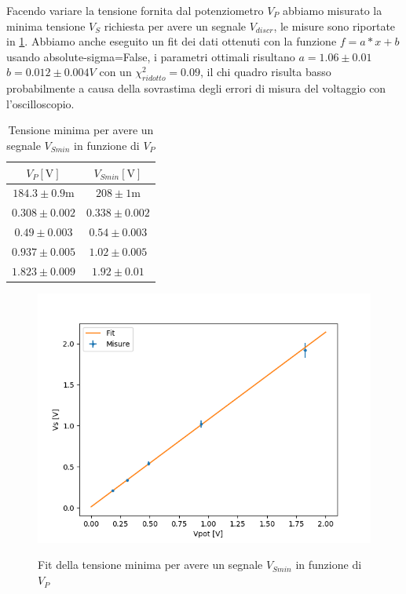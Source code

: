 \documentclass{article}
\begin{document}
		Facendo variare la tensione fornita dal potenziometro $V_P$ abbiamo misurato la minima tensione $V_S$ richiesta per avere un segnale $V_{discr}$, le misure sono riportate in \ref{tab 1c2}. Abbiamo anche eseguito un fit dei dati ottenuti con la funzione $f=a*x+b$ usando absolute-sigma=False, i parametri ottimali risultano $a=1.06\pm0.01$ $b=0.012\pm0.004 V$ con un $\chi^2_{ridotto}=0.09$, il chi quadro risulta basso probabilmente a causa della sovrastima degli errori di misura del voltaggio con l'oscilloscopio.
		\begin{table}
			\begin{center}
				\begin{tabular}{cc}
					\hline
					$V_P [\mathrm{V}]$&$V_{Smin} [\mathrm{V}]$ \\
					\hline
					$184.3\pm0.9 \mathrm{m}$ & $208\pm1\mathrm{m}$ \\
					$0.308\pm0.002$ & $0.338\pm0.002$ \\
					$0.49\pm0.003$ & $0.54\pm0.003$ \\
					$0.937\pm0.005$ & $1.02\pm0.005$ \\
					$1.823\pm0.009$ & $1.92\pm0.01$ \\
				\end{tabular}
			\end{center}
			\label{tab 1c2}
			\caption{Tensione minima per avere un segnale $V_{Smin}$ in funzione di $V_{P}$}	
		\end{table}
		
		\begin{figure}
			\centering
			\includegraphics[width=\linewidth]{immagini/1c-2.png}
			\label{fit:1c-2}
			\caption{Fit della tensione minima per avere un segnale $V_{Smin}$ in funzione di $V_{P}$}
		\end{figure}
\end{document}
